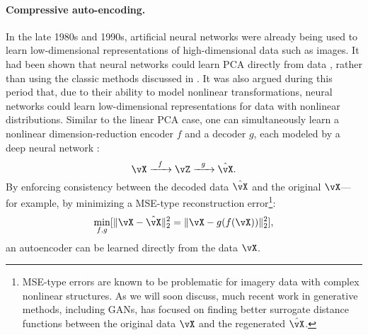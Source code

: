 \documentclass[../../book-main.tex]{subfiles}
\begin{document}
\paragraph{Compressive auto-encoding.}
In the late 1980s and 1990s, artificial neural networks were already being used to learn low-dimensional representations of high-dimensional data such as images. It had been shown that neural networks could learn PCA directly from data \cite{Oja1982SimplifiedNM,Baldi89}, rather than using the classic methods discussed in . It was also argued during this period that, due to their ability to model nonlinear transformations, neural networks could learn low-dimensional representations for data with nonlinear distributions. Similar to the linear PCA case, one can simultaneously learn a nonlinear dimension-reduction encoder \(f\) and a decoder \(g\), each modeled by a deep neural network \cite{Rumelhart1986,Kramer1991NonlinearPC}:
\begin{equation}
    \vX   \xrightarrow{\hspace{2mm} f \hspace{2mm}} \vZ  \xrightarrow{\hspace{2mm} g \hspace{2mm}} \hat{\vX}.
       \label{eqn:auto-encoding-deep-networks}
\end{equation}
By enforcing consistency between the decoded data \(\hat{\vX}\) and the original \(\vX\)---for example, by minimizing a MSE-type reconstruction error\footnote{MSE-type errors are known to be problematic for imagery data with complex nonlinear structures. As we will soon discuss, much recent work in generative methods, including GANs, has focused on finding better surrogate distance functions between the original data \(\vX\) and the regenerated \(\hat{\vX}\).}:
\begin{equation}
    \min_{f,g} [\|\vX - \hat{\vX}\|_{2}^{2} = \|\vX - g(f(\vX))\|_{2}^{2}],
\end{equation}
an autoencoder can be learned directly from the data \(\vX\).
\end{document}
